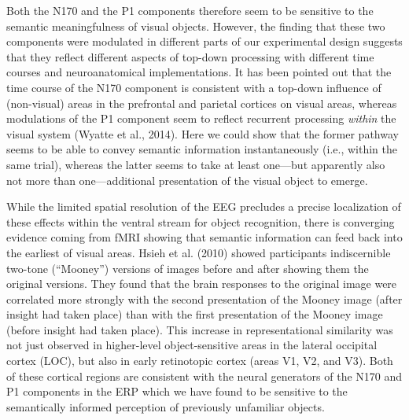 \documentclass[
  english,
  doc,12pt,twoside,floatsintext]{apa7}
\begin{document}
Both the N170 and the P1 components therefore seem to be sensitive to the semantic meaningfulness of visual objects. However, the finding that these two components were modulated in different parts of our experimental design suggests that they reflect different aspects of top-down processing with different time courses and neuroanatomical implementations. It has been pointed out that the time course of the N170 component is consistent with a top-down influence of (non-visual) areas in the prefrontal and parietal cortices on visual areas, whereas modulations of the P1 component seem to reflect recurrent processing \emph{within} the visual system (Wyatte et al., 2014). Here we could show that the former pathway seems to be able to convey semantic information instantaneously (i.e., within the same trial), whereas the latter seems to take at least one---but apparently also not more than one---additional presentation of the visual object to emerge.

While the limited spatial resolution of the EEG precludes a precise localization of these effects within the ventral stream for object recognition, there is converging evidence coming from fMRI showing that semantic information can feed back into the earliest of visual areas. Hsieh et al. (2010) showed participants indiscernible two-tone (``Mooney'') versions of images before and after showing them the original versions. They found that the brain responses to the original image were correlated more strongly with the second presentation of the Mooney image (after insight had taken place) than with the first presentation of the Mooney image (before insight had taken place). This increase in representational similarity was not just observed in higher-level object-sensitive areas in the lateral occipital cortex (LOC), but also in early retinotopic cortex (areas V1, V2, and V3). Both of these cortical regions are consistent with the neural generators of the N170 and P1 components in the ERP which we have found to be sensitive to the semantically informed perception of previously unfamiliar objects.
\end{document}
